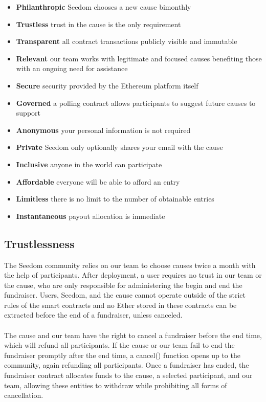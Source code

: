 \documentclass[11pt]{article}
\begin{document}
\begin{itemize}
\item{\textbf{Philanthropic} Seedom chooses a new cause bimonthly}
\item{\textbf{Trustless} trust in the cause is the only requirement}
\item{\textbf{Transparent} all contract transactions publicly visible and immutable}
\item{\textbf{Relevant} our team works with legitimate and focused causes benefiting those with an ongoing need for assistance}
\item{\textbf{Secure} security provided by the Ethereum platform itself}
\item{\textbf{Governed} a polling contract allows participants to suggest future causes to support}
\item{\textbf{Anonymous} your personal information is not required}
\item{\textbf{Private} Seedom only optionally shares your email with the cause}
\item{\textbf{Inclusive} anyone in the world can participate}
\item{\textbf{Affordable} everyone will be able to afford an entry}
\item{\textbf{Limitless} there is no limit to the number of obtainable entries}
\item{\textbf{Instantaneous} payout allocation is immediate}
\end{itemize}

\subsection{Trustlessness}

The Seedom community relies on our team to choose causes twice a month with the help of participants. After deployment, a user requires no trust in our team or the cause, who are only responsible for administering the begin and end the fundraiser. Users, Seedom, and the cause cannot operate outside of the strict rules of the smart contracts and no Ether stored in these contracts can be extracted before the end of a fundraiser, unless canceled.\\\\
The cause and our team have the right to cancel a fundraiser before the end time, which will refund all participants. If the cause or our team fail to end the fundraiser promptly after the end time, a cancel() function opens up to the community, again refunding all participants. Once a fundraiser has ended, the fundraiser contract allocates funds to the cause, a selected participant, and our team, allowing these entities to withdraw while prohibiting all forms of cancellation.
\end{document}
